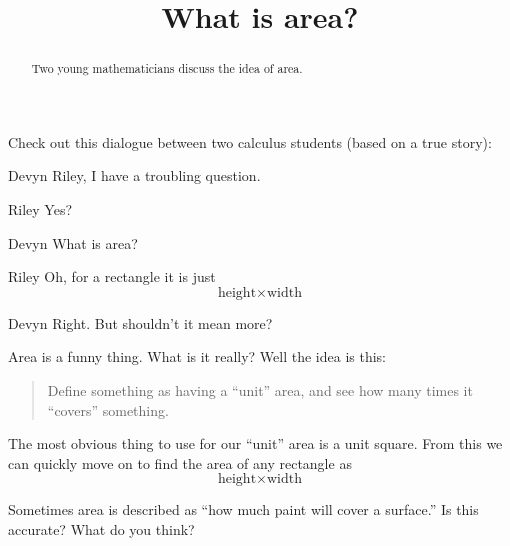 \documentclass{ximera}
\title[Break-Ground:]{What is area?}
\begin{document}
\begin{abstract}
Two young mathematicians discuss the idea of area.
\end{abstract}
\maketitle




Check out this dialogue between two calculus students (based on a true
story):

\begin{dialogue}
\item[Devyn] Riley, I have a troubling question.
\item[Riley] Yes? 
\item[Devyn] What is area?
\item[Riley] Oh, for a rectangle it is just
  \[
  \text{height}
  \times
  \text{width}
  \]
\item[Devyn] Right. But shouldn't it mean more?
\end{dialogue}

Area is a funny thing. What is it really? Well the idea is this:
\begin{quote}
Define something as having a ``unit'' area, and see how many times it
``covers'' something.
\end{quote}
The most obvious thing to use for our ``unit'' area is a unit
square. From this we can quickly move on to find the area of any
rectangle as
  \[
  \text{height}
  \times
  \text{width}
  \]
\begin{problem}
  Sometimes area is described as ``how much paint will cover a surface.''
  Is this accurate? What do you think?
  \begin{freeResponse}
  \end{freeResponse}
\end{problem}
%
\end{document}
